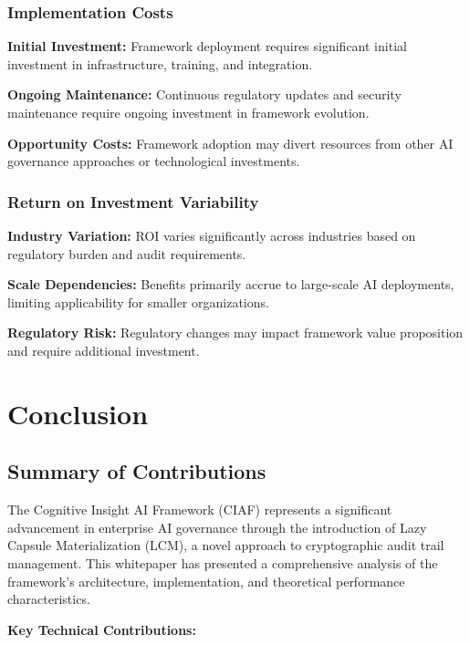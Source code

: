 \documentclass[12pt,a4paper]{article}
\begin{document}
\subsubsection{Implementation Costs}

\textbf{Initial Investment:} Framework deployment requires significant initial investment in infrastructure, training, and integration.

\textbf{Ongoing Maintenance:} Continuous regulatory updates and security maintenance require ongoing investment in framework evolution.

\textbf{Opportunity Costs:} Framework adoption may divert resources from other AI governance approaches or technological investments.

\subsubsection{Return on Investment Variability}

\textbf{Industry Variation:} ROI varies significantly across industries based on regulatory burden and audit requirements.

\textbf{Scale Dependencies:} Benefits primarily accrue to large-scale AI deployments, limiting applicability for smaller organizations.

\textbf{Regulatory Risk:} Regulatory changes may impact framework value proposition and require additional investment.

\section{Conclusion}

\subsection{Summary of Contributions}

The Cognitive Insight AI Framework (CIAF) represents a significant advancement in enterprise AI governance through the introduction of Lazy Capsule Materialization (LCM\texttrademark), a novel approach to cryptographic audit trail management. This whitepaper has presented a comprehensive analysis of the framework's architecture, implementation, and theoretical performance characteristics.

\textbf{Key Technical Contributions:}
\end{document}
